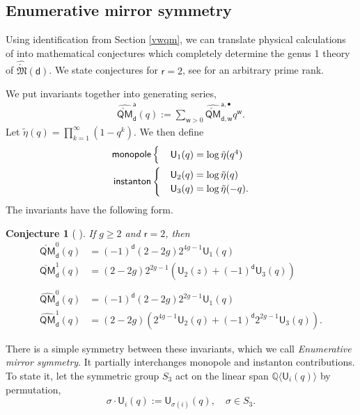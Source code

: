 \documentclass[11pt, reqno]{amsart}
\theoremstyle{plain}
\newtheorem*{conjno}{Conjecture}
\theoremstyle{definition}
\theoremstyle{remark}
\newcommand{\BQ}{{\mathbb{Q}}}
\newcommand{\wsf}{{\mathsf{w}}}
\newcommand{\rsf}{{\mathsf{r}}}
\newcommand{\dsf}{{\mathsf{d}}}
\newcommand{\asf}{{\mathsf{a}}}
\newcommand{\Usf}{{\mathsf{U}}}
\newcommand{\QMs}{\check{\mathsf{QM}}}
\newcommand{\QMp}{\hat{\mathsf{QM}}}
\newcommand{\QMsp}{\hat{\check{\mathsf{QM}}}}
\newcommand{\FMsp}{\hat{\check{\mathfrak{M}}}}
\begin{document}
\subsection{Enumerative mirror symmetry} \label{applications2} Using identification from Section \ref{vwqm}, we can translate physical calculations of  \cite{MM} into mathematical conjectures which completely determine the genus 1 theory of $\FMsp(\dsf)$. We state conjectures for $\rsf=2$, see \cite[Section 7.2]{N} for an arbitrary prime rank.

We put invariants together into generating series,
\begin{align*}
	\QMsp^{\asf}_{\dsf}(q):= \sum_{\wsf>0} \QMsp^{\asf, \bullet}_{\dsf, \mathsf w}q^{\mathsf w}.
\end{align*}
Let $\tilde{\eta}(q)=\prod^{\infty}_{k=1}(1-q^k).$ We then define
\begin{align*}
\textsf{monopole}  & \begin{cases}	&\hspace{0.05cm}\Usf_1(q)= \log \tilde{\eta}(q^4)\end{cases}\\
	\textsf{instanton} &\begin{cases}  &\Usf_2(q)= \log \tilde{\eta}(q)\\
&\Usf_3(q)= \log\tilde{\eta}(-q). \end{cases}
\end{align*}
The invariants have the following form. 
\begin{conjno}[\hspace{-0.1cm} \cite{Nhiggs}] \label{wnonzero} If $g\geq 2$ and $\rsf=2$, then
	\begin{align*}
		\QMs^0_{\dsf}(q)&=(-1)^\dsf(2-2g)2^{4g-1}  \Usf_1(q) \\	
		\QMs^1_{\dsf}(q)&=(2-2g) 2^{2g-1 }(\Usf_2(z)+(-1)^\dsf\Usf_3(q)) \\
		\\
		\QMp^0_{\dsf}(q)&=(-1)^{\dsf}(2-2g)2^{2g-1}\Usf_1(q) \\
		\QMp^1_{\dsf}(q)&=(2-2g) (2^{4g-1}  \Usf_2(q) +(-1)^{\dsf} 2^{2g-1}  \Usf_3(q)).
	\end{align*}
\end{conjno}
There is a simple symmetry between these invariants, which we call \textit{Enumerative mirror symmetry}.  It partially interchanges monopole and instanton contributions.  To state it, let the symmetric group $S_3$ act on the linear span $ \BQ\langle \Usf_i(q) \rangle $ by permutation, 
\[ \sigma \cdot \Usf_i(q):=\Usf_{\sigma(i)}(q), \quad \sigma \in S_3.\]
\end{document}
